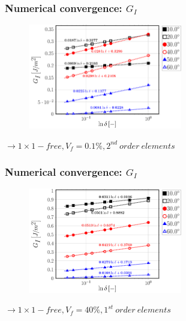 \documentclass[first,firstsupp,lastsupp,last,hyperref,table]{ETHclass}
\begin{document}
\addtocounter{framenumber}{-1}

\begin{frame}
\frametitle{\vspace{0.25cm}\small Numerical convergence: $G_{I}$}
\vspace{-.75cm}
\centering
\begin{figure}
\centering
\includegraphics[width=0.6\textwidth]{Vf0_1-free-2nd-semilogvsDelta-GI.pdf}
\end{figure}
$\rightarrow 1\times1-free, V_{f}=0.1\%, 2^{nd}\ order\ elements$ 
\end{frame}

\addtocounter{framenumber}{-1}

\begin{frame}
\frametitle{\vspace{0.25cm}\small Numerical convergence: $G_{I}$}
\vspace{-.75cm}
\centering
\begin{figure}
\centering
\includegraphics[width=0.6\textwidth]{Vf40-free-1st-semilogvsDelta-GI.pdf}
\end{figure}
$\rightarrow 1\times1-free, V_{f}=40\%, 1^{st}\ order\ elements$ 
\end{frame}

\addtocounter{framenumber}{-1}
\end{document}
